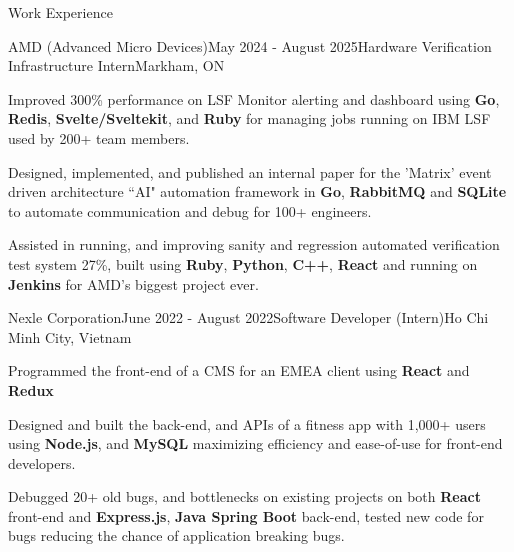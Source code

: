 \documentclass[
	11pt, %
]{resume} %
\begin{document}

\begin{rSection}{Work Experience}
	\begin{rSubsection}{AMD (Advanced Micro Devices)}{May 2024 - August 2025}{Hardware Verification Infrastructure Intern}{Markham, ON}
	\item Improved 300\% performance on LSF Monitor alerting and dashboard using \textbf{Go}, \textbf{Redis}, \textbf{Svelte/Sveltekit}, and \textbf{Ruby} for managing jobs running on IBM LSF used by 200+ team members.
	\item Designed, implemented, and published an internal paper for the 'Matrix' event driven architecture ``AI" automation framework in \textbf{Go}, \textbf{RabbitMQ} and \textbf{SQLite} to automate communication and debug for 100+ engineers.
	\item Assisted in running, and improving sanity and regression automated verification test system 27\%, built using \textbf{Ruby}, \textbf{Python}, \textbf{C++}, \textbf{React} and running on \textbf{Jenkins} for AMD's biggest project ever.
	\end{rSubsection}
	\begin{rSubsection}{Nexle Corporation}{June 2022 - August 2022}{Software Developer (Intern)}{Ho Chi Minh City, Vietnam}
		\item Programmed the front-end of a CMS for an EMEA client using \textbf{React} and \textbf{Redux}
		\item Designed and built the back-end, and APIs of a fitness app with 1,000+ users using \textbf{Node.js}, and \textbf{MySQL} maximizing efficiency and ease-of-use for front-end developers.
		\item Debugged 20+ old bugs, and bottlenecks on existing projects on both \textbf{React} front-end and \textbf{Express.js}, \textbf{Java Spring Boot} back-end, tested new code for bugs reducing the chance of application breaking bugs.
	\end{rSubsection}


\end{rSection}
\end{document}
